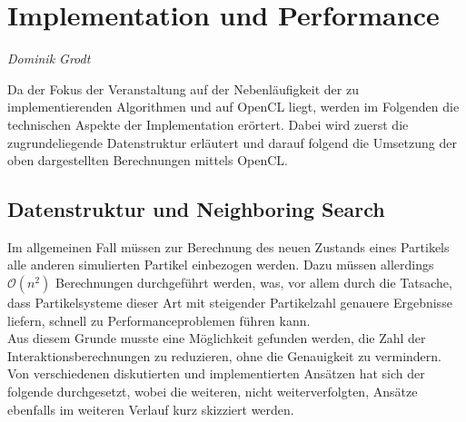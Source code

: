 \section{Implementation und Performance}


\begin{center}
\emph{{\small Dominik Grodt}}
\end{center}

\bigskip

Da der Fokus der Veranstaltung auf der Nebenläufigkeit der zu implementierenden Algorithmen und auf OpenCL liegt, werden im Folgenden die technischen Aspekte der Implementation erörtert. Dabei wird zuerst die zugrundeliegende Datenstruktur erläutert und darauf folgend die Umsetzung der oben dargestellten Berechnungen mittels OpenCL.

\subsection{Datenstruktur und Neighboring Search}
Im allgemeinen Fall müssen zur Berechnung des neuen Zustands eines Partikels alle anderen simulierten Partikel einbezogen werden. Dazu müssen allerdings $\mathcal O(n^2)$ Berechnungen durchgeführt werden, was, vor allem durch die Tatsache, dass Partikelsysteme dieser Art mit steigender Partikelzahl genauere Ergebnisse liefern, schnell zu Performanceproblemen führen kann.\\
Aus diesem Grunde musste eine Möglichkeit gefunden werden, die Zahl der Interaktionsberechnungen zu reduzieren, ohne die Genauigkeit zu vermindern. Von verschiedenen diskutierten und implementierten Ansätzen hat sich der folgende durchgesetzt, wobei die weiteren, nicht weiterverfolgten, Ansätze ebenfalls im weiteren Verlauf kurz skizziert werden.
